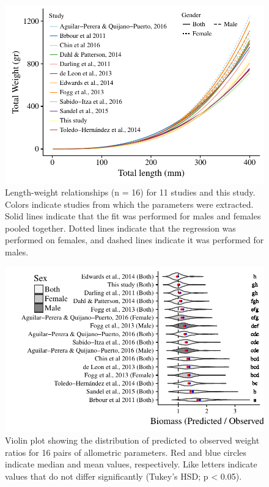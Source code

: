 \documentclass[fleqn,10pt,lineno]{wlpeerj} %
\theoremstyle{definition}
\theoremstyle{definition}
\theoremstyle{definition}
\theoremstyle{remark}
\begin{document}
\begin{figure}
\centering
\includegraphics{Manuscript_files/figure-latex/unnamed-chunk-5-1.pdf}
\caption{\label{fig:unnamed-chunk-5}\label{fig:all_allo}Length-weight
relationships (n = 16) for 11 studies and this study. Colors indicate
studies from which the parameters were extracted. Solid lines indicate
that the fit was performed for males and females pooled together. Dotted
lines indicate that the regression was performed on females, and dashed
lines indicate it was performed for males.}
\end{figure}

\begin{figure}
\centering
\includegraphics{Manuscript_files/figure-latex/unnamed-chunk-6-1.pdf}
\caption{\label{fig:unnamed-chunk-6}\label{fig:bio_ratio}Violin plot showing
the distribution of predicted to observed weight ratios for 16 pairs of
allometric parameters. Red and blue circles indicate median and mean
values, respectively. Like letters indicate values that do not differ
significantly (Tukey's HSD; p \textless{} 0.05).}
\end{figure}
\end{document}
